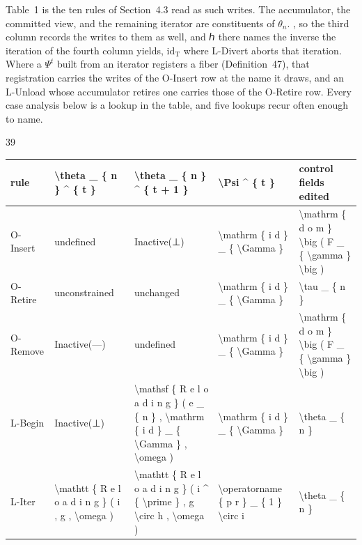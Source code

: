 \documentclass[
  10
]{article}
\newcounter{none} %
\begin{document}
Table~1 is the ten rules of Section~4.3 read as such writes. The
accumulator, the committed view, and the remaining iterator are
constituents of \(\theta _ { n } .\) , so the third column records the
writes to them as well, and ℎ there names the inverse the iteration of
the fourth column yields, \(\mathrm { i d _ { T } }\) where L-Divert
aborts that iteration. Where a \(\Psi ^ { t }\) built from an iterator
registers a fiber (Definition~47), that registration carries the writes
of the O-Insert row at the name it draws, and an L-Unload whose
accumulator retires one carries those of the O-Retire row. Every case
analysis below is a lookup in the table, and five lookups recur often
enough to name.

39

{\def\LTcaptype{none} %
\begin{longtable}[]{@{}|l|l|l|l|l|@{}}
\toprule\noalign{}
\endhead
\bottomrule\noalign{}
\endlastfoot
\hline
rule & \textbackslash theta \_ \{ n \} \^{} \{ t \} &
\textbackslash theta \_ \{ n \} \^{} \{ t + 1 \} & \textbackslash Psi
\^{} \{ t \} & control fields edited \\
\hline
O-Insert & undefined & Inactive(⊥) & \textbackslash mathrm \{ i d \} \_
\{ \textbackslash Gamma \} & \textbackslash mathrm \{ d o m \}
\textbackslash big ( F \_ \{ \textbackslash gamma \} \textbackslash big
) \\
\hline
O-Retire & unconstrained & unchanged & \textbackslash mathrm \{ i d \}
\_ \{ \textbackslash Gamma \} & \textbackslash tau \_ \{ n \} \\
\hline
O-Remove & Inactive(---) & undefined & \textbackslash mathrm \{ i d \}
\_ \{ \textbackslash Gamma \} & \textbackslash mathrm \{ d o m \}
\textbackslash big ( F \_ \{ \textbackslash gamma \} \textbackslash big
) \\
\hline
L-Begin & Inactive(⊥) & \textbackslash mathsf \{ R e l o a d i n g \} (
e \_ \{ n \} , \textbackslash mathrm \{ i d \} \_ \{
\textbackslash Gamma \} , \textbackslash omega ) & \textbackslash mathrm
\{ i d \} \_ \{ \textbackslash Gamma \} & \textbackslash theta \_ \{ n
\} \\
\hline
L-Iter & \textbackslash mathtt \{ R e l o a d i n g \} ( i , g ,
\textbackslash omega ) & \textbackslash mathtt \{ R e l o a d i n g \} (
i \^{} \{ \textbackslash prime \} , g \textbackslash circ h ,
\textbackslash omega ) & \textbackslash operatorname \{ p r \} \_ \{ 1
\} \textbackslash circ i & \textbackslash theta \_ \{ n \} \\
\hline

\end{longtable}}
\end{document}
